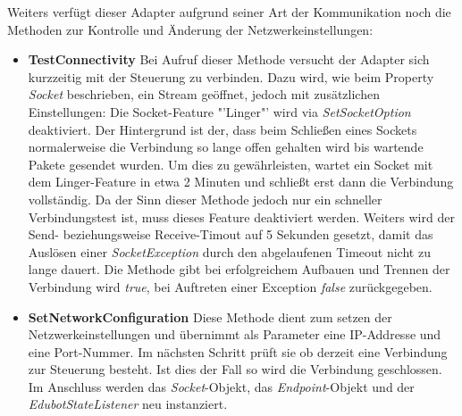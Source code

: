 Weiters verfügt dieser Adapter aufgrund seiner Art der Kommunikation noch die Methoden zur Kontrolle und Änderung der Netzwerkeinstellungen:
\begin{itemize}
\item \textbf{TestConnectivity}
\newline
 Bei Aufruf dieser Methode versucht der Adapter sich kurzzeitig mit der Steuerung zu verbinden. Dazu wird, wie beim Property \textit{Socket} beschrieben, ein Stream geöffnet, jedoch mit zusätzlichen Einstellungen: Die Socket-Feature "'Linger"' wird via \textit{SetSocketOption} deaktiviert. Der Hintergrund ist der, dass beim Schließen eines Sockets normalerweise die Verbindung so lange offen gehalten wird bis wartende Pakete gesendet wurden. Um dies zu gewährleisten, wartet ein Socket mit dem Linger-Feature in etwa 2 Minuten und schließt erst dann die Verbindung vollständig. Da der Sinn dieser Methode jedoch nur ein schneller Verbindungstest ist, muss dieses Feature deaktiviert werden. Weiters wird der Send- beziehungsweise Receive-Timout auf 5 Sekunden gesetzt, damit das Auslösen einer \textit{SocketException} durch den abgelaufenen Timeout nicht zu lange dauert. Die Methode gibt bei erfolgreichem Aufbauen und Trennen der Verbindung wird \textit{true}, bei Auftreten einer Exception \textit{false} zurückgegeben.
\item \textbf{SetNetworkConfiguration}
\newline
Diese Methode dient zum setzen der Netzwerkeinstellungen und übernimmt als Parameter eine IP-Addresse und eine Port-Nummer. Im nächsten Schritt prüft sie ob derzeit eine Verbindung zur Steuerung besteht. Ist dies der Fall so wird die Verbindung geschlossen. Im Anschluss werden das \textit{Socket}-Objekt, das \textit{Endpoint}-Objekt und der \textit{EdubotStateListener} neu instanziert.
\end{itemize}


